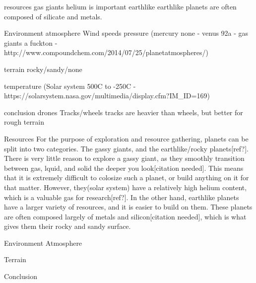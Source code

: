 resources
    gas giants
        helium is important
    earthlike
        earthlike planets are often composed of silicate and metals.


Environment
    atmosphere
        Wind speeds
        pressure (mercury none - venus 92a - gas giants a fuckton - http://www.compoundchem.com/2014/07/25/planetatmospheres/)

    terrain
        rocky/sandy/none

    temperature (Solar system 500C to -250C - https://solarsystem.nasa.gov/multimedia/display.cfm?IM_ID=169)
    
conclusion
    drones
    Tracks/wheels
        tracks are heavier than wheels, but better for rough terrain


Resources
For the purpose of exploration and resource gathering, planets can be split into two categories. The gassy giants, and the earthlike/rocky planets[ref?].
There is very little reason to explore a gassy giant, as they smoothly transition between gas, lquid, and solid the deeper you look[citation needed]. This means that it is extremely difficult to colosize such a planet, or build anything on it for that matter. However, they(solar system) have a relatively high helium content, which is a valuable gas for research[ref?]. 
In the other hand, earthlike planets have a larger variety of resources, and it is easier to build on them. These planets are often composed largely of metals and silicon[citation needed], which is what gives them their rocky and sandy surface.

Environment
    Atmosphere
    

    Terrain
    

Conclusion

